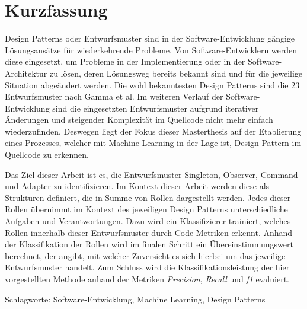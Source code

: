 \chapter*{Kurzfassung}
\thispagestyle{empty}

Design Patterns oder Entwurfsmuster sind in der Software-Entwicklung gängige Lösungsansätze für wiederkehrende Probleme.
Von Software-Entwicklern werden diese eingesetzt, um Probleme in der Implementierung oder in der Software-Architektur zu lösen, deren Lösungsweg bereits bekannt sind und für die jeweilige Situation abgeändert werden. Die wohl bekanntesten Design Patterns sind die 23 Entwurfsmuster nach Gamma et al.
Im weiteren Verlauf der Software-Entwicklung sind die eingesetzten Entwurfsmuster aufgrund iterativer Änderungen und steigender Komplexität im Quellcode nicht mehr einfach wiederzufinden.
Deswegen liegt der Fokus dieser Masterthesis auf der Etablierung eines Prozesses, welcher mit Machine Learning in der Lage ist, Design Pattern im Quellcode zu erkennen.

Das Ziel dieser Arbeit ist es, die Entwurfsmuster Singleton, Observer, Command und Adapter zu identifizieren. Im Kontext dieser Arbeit werden diese als Strukturen definiert, die in Summe von Rollen dargestellt werden.
Jedes dieser Rollen übernimmt im Kontext des jeweiligen Design Patterns unterschiedliche Aufgaben und Verantwortungen.
Dazu wird ein Klassifizierer trainiert, welches Rollen innerhalb dieser Entwurfsmuster durch Code-Metriken erkennt.
Anhand der Klassifikation der Rollen wird im finalen Schritt ein Übereinstimmungswert berechnet, der angibt, mit welcher Zuversicht es sich hierbei um das jeweilige Entwurfsmuster handelt.
Zum Schluss wird die Klassifikationsleistung der hier vorgestellten Methode anhand der Metriken \textit{Precision}, \textit{Recall} und \textit{f1} evaluiert. 

\bigskip

\noindent
Schlagworte: Software-Entwicklung, Machine Learning, Design Patterns 

